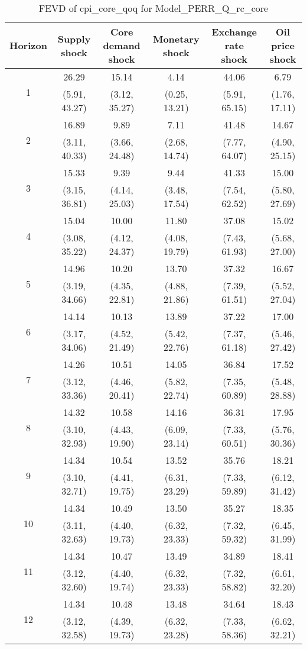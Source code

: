 \documentclass{article}
\begin{document}
\begin{table}
	\footnotesize
	\caption{FEVD of cpi_core_qoq for Model_PERR_Q_rc_core}
	\begin{tabular}{cccccc}
		Horizon & Supply shock & Core demand shock & Monetary shock & Exchange rate shock & Oil price shock\\ \hline
		\multirow{2}{*}{1} & 26.29 & 15.14 & 4.14 & 44.06 & 6.79\\
		 & (5.91, 43.27) & (3.12, 35.27) & (0.25, 13.21) & (5.91, 65.15) & (1.76, 17.11)\\
		\multirow{2}{*}{2} & 16.89 & 9.89 & 7.11 & 41.48 & 14.67\\
		 & (3.11, 40.33) & (3.66, 24.48) & (2.68, 14.74) & (7.77, 64.07) & (4.90, 25.15)\\
		\multirow{2}{*}{3} & 15.33 & 9.39 & 9.44 & 41.33 & 15.00\\
		 & (3.15, 36.81) & (4.14, 25.03) & (3.48, 17.54) & (7.54, 62.52) & (5.80, 27.69)\\
		\multirow{2}{*}{4} & 15.04 & 10.00 & 11.80 & 37.08 & 15.02\\
		 & (3.08, 35.22) & (4.12, 24.37) & (4.08, 19.79) & (7.43, 61.93) & (5.68, 27.00)\\
		\multirow{2}{*}{5} & 14.96 & 10.20 & 13.70 & 37.32 & 16.67\\
		 & (3.19, 34.66) & (4.35, 22.81) & (4.88, 21.86) & (7.39, 61.51) & (5.52, 27.04)\\
		\multirow{2}{*}{6} & 14.14 & 10.13 & 13.89 & 37.22 & 17.00\\
		 & (3.17, 34.06) & (4.52, 21.49) & (5.42, 22.76) & (7.37, 61.18) & (5.46, 27.42)\\
		\multirow{2}{*}{7} & 14.26 & 10.51 & 14.05 & 36.84 & 17.52\\
		 & (3.12, 33.36) & (4.46, 20.41) & (5.82, 22.74) & (7.35, 60.89) & (5.48, 28.88)\\
		\multirow{2}{*}{8} & 14.32 & 10.58 & 14.16 & 36.31 & 17.95\\
		 & (3.10, 32.93) & (4.43, 19.90) & (6.09, 23.14) & (7.33, 60.51) & (5.76, 30.36)\\
		\multirow{2}{*}{9} & 14.34 & 10.54 & 13.52 & 35.76 & 18.21\\
		 & (3.10, 32.71) & (4.41, 19.75) & (6.31, 23.29) & (7.33, 59.89) & (6.12, 31.42)\\
		\multirow{2}{*}{10} & 14.34 & 10.49 & 13.50 & 35.27 & 18.35\\
		 & (3.11, 32.63) & (4.40, 19.73) & (6.32, 23.33) & (7.32, 59.32) & (6.45, 31.99)\\
		\multirow{2}{*}{11} & 14.34 & 10.47 & 13.49 & 34.89 & 18.41\\
		 & (3.12, 32.60) & (4.40, 19.74) & (6.32, 23.33) & (7.32, 58.82) & (6.61, 32.20)\\
		\multirow{2}{*}{12} & 14.34 & 10.48 & 13.48 & 34.64 & 18.43\\
		 & (3.12, 32.58) & (4.39, 19.73) & (6.32, 23.28) & (7.33, 58.36) & (6.62, 32.21)\\
	\end{tabular}
\label{tab:fevd-Model_PERR_Q_rc_core-cpi_core_qoq}
\end{table}
\end{document}
